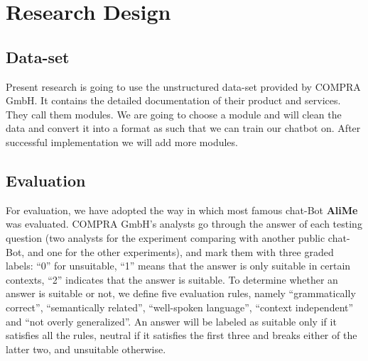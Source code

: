 \documentclass[a4paper,12pt]{article}
\begin{document}
\newpage

\section{Research Design}




\subsection{Data-set}

Present research is going to use the unstructured data-set provided by COMPRA GmbH. It contains the detailed documentation of their product and services. They call them modules. We are going to choose a module and will clean the data and convert it into a format as such that we can train our chatbot on. After successful implementation we will add more modules.




\subsection{Evaluation}
For evaluation, we have adopted the way in which most famous chat-Bot \textbf{AliMe} was evaluated. COMPRA GmbH's analysts go through the answer of each testing question (two analysts for the experiment comparing with another public chat-Bot, and one for the other experiments), and mark them with three graded labels: “0” for unsuitable, “1” means that the answer is only suitable in certain contexts, “2” indicates that the answer is suitable. To determine whether an answer is suitable or not, we define five evaluation rules, namely “grammatically correct”, “semantically related”, “well-spoken language”, “context independent” and “not overly generalized”. An answer will be labeled as suitable only if it satisfies all the rules, neutral if it satisfies the first three and breaks either of the latter two, and unsuitable otherwise.%
\end{document}
